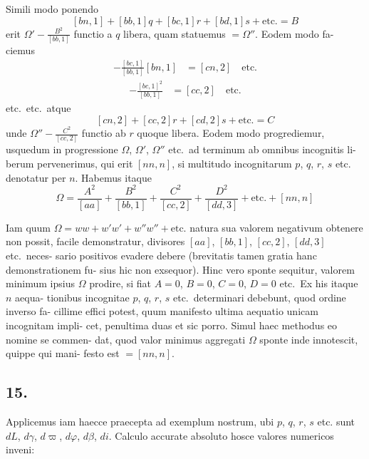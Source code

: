 \documentclass[12pt,a4paper]{article}
\begin{document}
Simili modo ponendo
\[
[bn, 1] + [bb, 1]q + [bc, 1]r + [bd, 1]s + \text{etc.} = B
\]
erit $\Omega' - \frac{B^2}{[bb, 1]}$ functio a $q$ libera, quam statuemus $= \Omega''$. Eodem modo fa-
ciemus
\begin{align*}
[cn, 1] - \frac{[bc, 1]}{[bb, 1]}[bn, 1] &= [cn, 2] \quad \text{etc.}
\end{align*}
\begin{align*}
[cc, 1] - \frac{[bc, 1]^2}{[bb, 1]} &= [cc, 2] \quad \text{etc.}
\end{align*}
etc.\ etc.\ atque
\[
[cn, 2] + [cc, 2]r + [cd, 2]s + \text{etc.} = C
\]
unde $\Omega'' - \frac{C^2}{[cc, 2]}$ functio ab $r$ quoque libera. Eodem modo progrediemur,
usquedum in progressione $\Omega$, $\Omega'$, $\Omega''$ etc.\ ad terminum ab omnibus incognitis li-
berum pervenerimus, qui erit $[nn, n]$, si multitudo incognitarum $p$, $q$, $r$, $s$ etc. denotatur per $n$. Habemus itaque
\[
\Omega = \frac{A^2}{[aa]} + \frac{B^2}{[bb, 1]} + \frac{C^2}{[cc, 2]} + \frac{D^2}{[dd, 3]} + \text{etc.} + [nn, n]
\]

Iam quum $\Omega = ww + w'w' + w''w'' + \text{etc.}$ natura sua valorem negativum obtenere
non possit, facile demonstratur, divisores $[aa]$, $[bb, 1]$, $[cc, 2]$, $[dd, 3]$ etc.\ neces-
sario positivos evadere debere (brevitatis tamen gratia hanc demonstrationem fu-
sius hic non exsequor). Hinc vero sponte sequitur, valorem minimum ipsius $\Omega$
prodire, si fiat $A = 0$, $B = 0$, $C = 0$, $D = 0$ etc.\ Ex his itaque $n$ aequa-
tionibus incognitae $p$, $q$, $r$, $s$ etc.\ determinari debebunt, quod ordine inverso fa-
cillime effici potest, quum manifesto ultima aequatio unicam incognitam impli-
cet, penultima duas et sic porro. Simul haec methodus eo nomine se commen-
dat, quod valor minimus aggregati $\Omega$ sponte inde innotescit, quippe qui mani-
festo est $= [nn, n]$.

\subsection*{15.}

Applicemus iam haecce praecepta ad exemplum nostrum, ubi $p$, $q$, $r$, $s$ etc. sunt $dL$, $d\gamma$, $d\varpi$, $d\varphi$, $d\beta$, $di$. Calculo accurate absoluto hosce valores numericos inveni:
\end{document}
